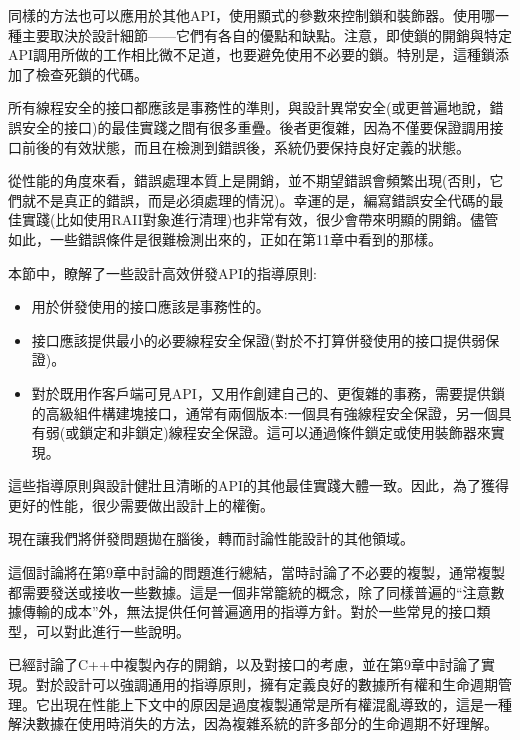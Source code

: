 同樣的方法也可以應用於其他API，使用顯式的參數來控制鎖和裝飾器。使用哪一種主要取決於設計細節——它們有各自的優點和缺點。注意，即使鎖的開銷與特定API調用所做的工作相比微不足道，也要避免使用不必要的鎖。特別是，這種鎖添加了檢查死鎖的代碼。

所有線程安全的接口都應該是事務性的準則，與設計異常安全(或更普遍地說，錯誤安全的接口)的最佳實踐之間有很多重疊。後者更復雜，因為不僅要保證調用接口前後的有效狀態，而且在檢測到錯誤後，系統仍要保持良好定義的狀態。 

從性能的角度來看，錯誤處理本質上是開銷，並不期望錯誤會頻繁出現(否則，它們就不是真正的錯誤，而是必須處理的情況)。幸運的是，編寫錯誤安全代碼的最佳實踐(比如使用RAII對象進行清理)也非常有效，很少會帶來明顯的開銷。儘管如此，一些錯誤條件是很難檢測出來的，正如在第11章中看到的那樣。

本節中，瞭解了一些設計高效併發API的指導原則:

\begin{itemize}
\item 
用於併發使用的接口應該是事務性的。

\item 
接口應該提供最小的必要線程安全保證(對於不打算併發使用的接口提供弱保證)。

\item 
對於既用作客戶端可見API，又用作創建自己的、更復雜的事務，需要提供鎖的高級組件構建塊接口，通常有兩個版本:一個具有強線程安全保證，另一個具有弱(或鎖定和非鎖定)線程安全保證。這可以通過條件鎖定或使用裝飾器來實現。
\end{itemize}

這些指導原則與設計健壯且清晰的API的其他最佳實踐大體一致。因此，為了獲得更好的性能，很少需要做出設計上的權衡。 

現在讓我們將併發問題拋在腦後，轉而討論性能設計的其他領域。


這個討論將在第9章中討論的問題進行總結，當時討論了不必要的複製，通常複製都需要發送或接收一些數據。這是一個非常籠統的概念，除了同樣普遍的“注意數據傳輸的成本”外，無法提供任何普遍適用的指導方針。對於一些常見的接口類型，可以對此進行一些說明。 

已經討論了C++中複製內存的開銷，以及對接口的考慮，並在第9章中討論了實現。對於設計可以強調通用的指導原則，擁有定義良好的數據所有權和生命週期管理。它出現在性能上下文中的原因是過度複製通常是所有權混亂導致的，這是一種解決數據在使用時消失的方法，因為複雜系統的許多部分的生命週期不好理解。 

